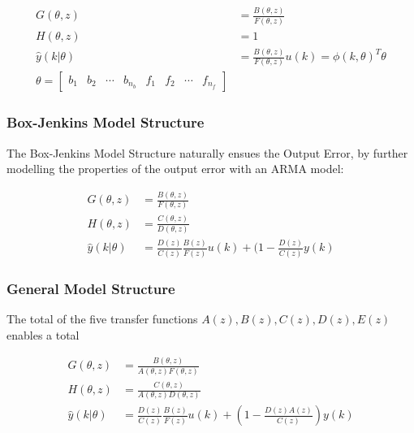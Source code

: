 \documentclass[10pt,a4paper]{scrartcl}
\begin{document}
\begin{multicols*}{2}


\begin{align*}
G(\theta,z)&=\frac{B(\theta,z)}{F(\theta,z)}\\
H(\theta,z)&=1\\
\hat{y}(k|\theta)&=\frac{B(\theta,z)}{F(\theta,z)}u(k)=\phi(k,\theta)^T\theta\\
\theta = \begin{bmatrix}
b_1&b_2&\cdots&b_{n_b}&f_1&f_2&\cdots&f_{n_f}
\end{bmatrix}
\end{align*}

\subsubsection{Box-Jenkins Model Structure}

The Box-Jenkins Model Structure naturally ensues the Output Error, by further modelling the properties of the output error with an ARMA model:



\begin{align*}
G(\theta,z)&=\frac{B(\theta,z)}{F(\theta,z)}\\
H(\theta,z)&=\frac{C(\theta,z)}{D(\theta,z)}\\
\hat{y}(k|\theta)&=\frac{D(z)}{C(z)}\frac{B(z)}{F(z)}u(k)+(1-\frac{D(z)}{C(z)}y(k)
\end{align*}

\subsubsection{General Model Structure}

The total of the five transfer functions $A(z), B(z),C(z),D(z),E(z)$ enables a total  


\newcommand{\tz}{(\theta,z)}
\begin{align*}
G(\theta,z)&=\frac{B\tz}{A\tz F\tz}\\
H\tz&=\frac{C\tz}{A\tz D\tz}\\
\hat{y}(k|\theta)&=\frac{D(z)}{C(z)}\frac{B(z)}{F(z)}u(k)+(1-\frac{D(z)A(z)}{C(z)})y(k)
\end{align*}


\end{multicols*}
\end{document}
